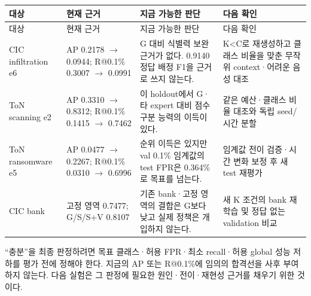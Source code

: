 \begingroup
\footnotesize
\begin{longtable}{>{\raggedright\arraybackslash}p{}>{\raggedright\arraybackslash}p{}>{\raggedright\arraybackslash}p{}>{\raggedright\arraybackslash}p{}}
\toprule
대상 & 현재 근거 & 지금 가능한 판단 & 다음 확인 \\ \midrule
\endfirsthead
대상 & 현재 근거 & 지금 가능한 판단 & 다음 확인 \\ \midrule
\endhead
{}CIC infiltration e6 & AP 0.2178 \ensuremath{\rightarrow} 0.0944; R@0.1\% 0.3007 \ensuremath{\rightarrow} 0.0991 & G 대비 식별력 보완 근거가 없다. 0.9140 정답 배정 F1을 근거로 쓰지 않는다. & K<C로 재생성하고 클래스 비율을 맞춘 무작위 context·어려운 음성 대조 \\
{}ToN scanning e2 & AP 0.3310 \ensuremath{\rightarrow} 0.8312; R@0.1\% 0.1415 \ensuremath{\rightarrow} 0.7462 & 이 holdout에서 G·타 expert 대비 점수 구분 능력의 이득이 있다. & 같은 예산·클래스 비율 대조와 독립 seed/\allowbreak{}시간 분할 \\
{}ToN ransomware e5 & AP 0.0477 \ensuremath{\rightarrow} 0.2267; R@0.1\% 0.0310 \ensuremath{\rightarrow} 0.6996 & 순위 이득은 있지만 val 0.1\% 임계값의 test FPR은 0.364\%로 목표를 넘는다. & 임계값 전이 검증·시간 변화 보정 후 새 test 재평가 \\
{}CIC bank & 고정 영역 0.7477; G/\allowbreak{}S/\allowbreak{}S+\allowbreak{}V 0.8107 & 기존 bank·고정 영역의 결합은 G보다 낮고 실제 정책은 개입하지 않는다. & 새 K 조건의 bank 재학습 및 정답 없는 validation 비교 \\
\bottomrule
\end{longtable}
\endgroup
“충분”을 최종 판정하려면 목표 클래스·허용 FPR·최소 recall·허용 global 성능 저하를 평가 전에 정해야 한다. 지금의 AP 또는 R@0.1\%에 임의의 합격선을 사후 부여하지 않는다. 다음 실험은 그 판정에 필요한 원인·전이·재현성 근거를 채우기 위한 것이다.

